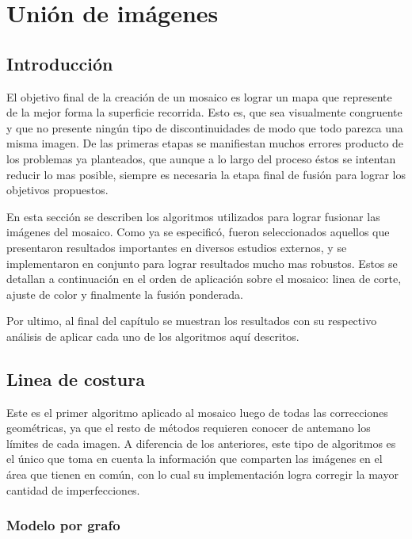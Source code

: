 \chapter{Unión de imágenes}
\label{capitulo5}


\section{Introducción}
El objetivo final de la creación de un mosaico es lograr un mapa que represente de la mejor forma la superficie recorrida. Esto es, que sea visualmente congruente y que no presente ningún tipo de discontinuidades de modo que todo parezca una misma imagen. De las primeras etapas se manifiestan muchos errores producto de los problemas ya planteados, que aunque a lo largo del proceso éstos se intentan reducir lo mas posible, siempre es necesaria la etapa final de fusión para lograr los objetivos propuestos.

En esta sección se describen los algoritmos utilizados para lograr fusionar las imágenes del mosaico. Como ya se especificó, fueron seleccionados aquellos que presentaron resultados importantes en diversos estudios externos, y se implementaron en conjunto para lograr resultados mucho mas robustos. Estos se detallan a continuación en el orden de aplicación sobre el mosaico: linea de corte, ajuste de color y finalmente la fusión ponderada.

Por ultimo, al final del capítulo se muestran los resultados con su respectivo análisis de aplicar cada uno de los algoritmos aquí descritos.
\clearpage


\section{Linea de costura}\label{seccion-corte}

Este es el primer algoritmo aplicado al mosaico luego de todas las correcciones geométricas, ya que el resto de métodos requieren conocer de antemano los límites de cada imagen. A diferencia de los anteriores, este tipo de algoritmos es el único que toma en cuenta la información que comparten las imágenes en el área que tienen en común, con lo cual su implementación logra corregir la mayor cantidad de imperfecciones. 

\subsection{Modelo por grafo}

